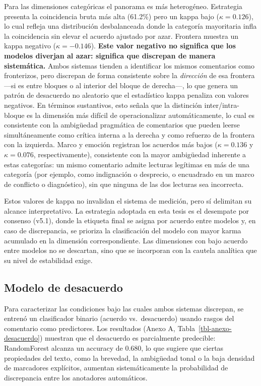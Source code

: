 \documentclass[
  letterpaper,
  numbers=noendperiod,
  fontsize=11pt,
  DIV=12,
  titlepage=false]{scrreprt}
\begin{document}
Para las dimensiones categóricas el panorama es más heterogéneo.
Estrategia presenta la coincidencia bruta más alta (61.2\%) pero un
kappa bajo (\(\kappa = 0.126\)), lo cual refleja una distribución
desbalanceada donde la categoría mayoritaria infla la coincidencia sin
elevar el acuerdo ajustado por azar. Frontera muestra un kappa negativo
(\(\kappa = -0.146\)). \textbf{Este valor negativo no significa que los
modelos diverjan al azar: significa que discrepan de manera
sistemática.} Ambos sistemas tienden a identificar los mismos
comentarios como fronterizos, pero discrepan de forma consistente sobre
la \emph{dirección} de esa frontera ---si es entre bloques o al interior
del bloque de derecha---, lo que genera un patrón de desacuerdo no
aleatorio que el estadístico kappa penaliza con valores negativos. En
términos sustantivos, esto señala que la distinción inter/intra-bloque
es la dimensión más difícil de operacionalizar automáticamente, lo cual
es consistente con la ambigüedad pragmática de comentarios que pueden
leerse simultáneamente como crítica interna a la derecha y como refuerzo
de la frontera con la izquierda. Marco y emoción registran los acuerdos
más bajos (\(\kappa = 0.136\) y \(\kappa = 0.076\), respectivamente),
consistente con la mayor ambigüedad inherente a estas categorías: un
mismo comentario admite lecturas legítimas en más de una categoría (por
ejemplo, como indignación o desprecio, o encuadrado en un marco de
conflicto o diagnóstico), sin que ninguna de las dos lecturas sea
incorrecta.

Estos valores de kappa no invalidan el sistema de medición, pero sí
delimitan su alcance interpretativo. La estrategia adoptada en esta
tesis es el desempate por consenso (v5.1), donde la etiqueta final se
asigna por acuerdo entre modelos y, en caso de discrepancia, se prioriza
la clasificación del modelo con mayor karma acumulado en la dimensión
correspondiente. Las dimensiones con bajo acuerdo entre modelos no se
descartan, sino que se incorporan con la cautela analítica que su nivel
de estabilidad exige.

\subsection{Modelo de desacuerdo}\label{modelo-de-desacuerdo}

Para caracterizar las condiciones bajo las cuales ambos sistemas
discrepan, se entrenó un clasificador binario (acuerdo vs.~desacuerdo)
usando rasgos del comentario como predictores. Los resultados (Anexo A,
Tabla~\ref{tbl-anexo-desacuerdo}) muestran que el desacuerdo es
parcialmente predecible: RandomForest alcanza un accuracy de 0.680, lo
que sugiere que ciertas propiedades del texto, como la brevedad, la
ambigüedad tonal o la baja densidad de marcadores explícitos, aumentan
sistemáticamente la probabilidad de discrepancia entre los anotadores
automáticos.
\end{document}
